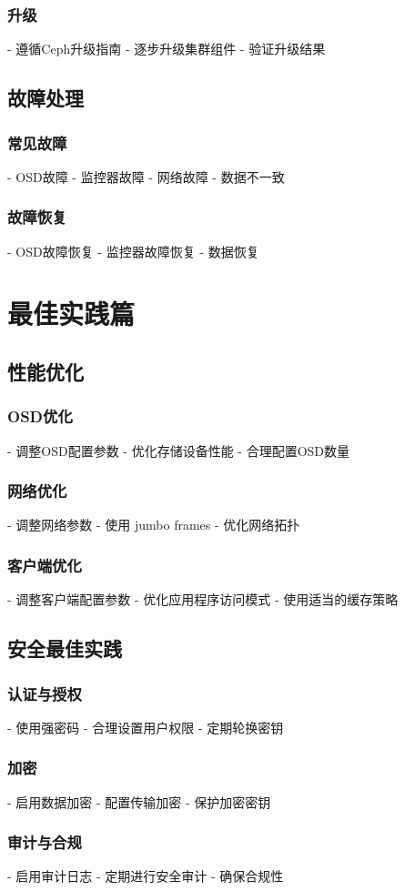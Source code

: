 \documentclass[12pt,UTF8]{ctexbook}
\begin{document}
\subsection{升级}
- 遵循Ceph升级指南
- 逐步升级集群组件
- 验证升级结果

\section{故障处理}

\subsection{常见故障}
- OSD故障
- 监控器故障
- 网络故障
- 数据不一致

\subsection{故障恢复}
- OSD故障恢复
- 监控器故障恢复
- 数据恢复

\chapter{最佳实践篇}
\section{性能优化}

\subsection{OSD优化}
- 调整OSD配置参数
- 优化存储设备性能
- 合理配置OSD数量

\subsection{网络优化}
- 调整网络参数
- 使用 jumbo frames
- 优化网络拓扑

\subsection{客户端优化}
- 调整客户端配置参数
- 优化应用程序访问模式
- 使用适当的缓存策略

\section{安全最佳实践}

\subsection{认证与授权}
- 使用强密码
- 合理设置用户权限
- 定期轮换密钥

\subsection{加密}
- 启用数据加密
- 配置传输加密
- 保护加密密钥

\subsection{审计与合规}
- 启用审计日志
- 定期进行安全审计
- 确保合规性

\backmatter
\end{document}
